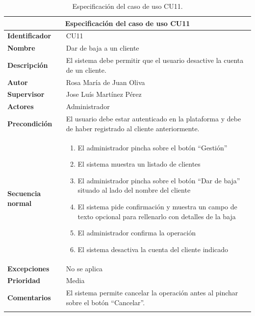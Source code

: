 \documentclass[pdftex,11pt,a4paper]{book}
\begin{document}

\renewcommand{\tablename}{Tabla}
\renewcommand{\arraystretch}{1,7}

\begin{center}
\begin{longtable}{|m{}|m{11cm}|}
\hline
\multicolumn{2}{|c|}{\textbf{Especificación del caso de uso CU11}}\\
\hline 
\endhead

\textbf{Identificador} & CU11  
\\ \hline
\textbf{Nombre} & Dar de baja a un cliente 
\\ \hline
\textbf{Descripción} & El sistema debe permitir que el usuario desactive la cuenta de un cliente.
\\ \hline
\textbf{Autor} & Rosa María de Juan Oliva 
\\ \hline
\textbf{Supervisor} & Jose Luís Martínez Pérez  
\\ \hline
\textbf{Actores} & Administrador 
\\ \hline
\textbf{Precondición} & El usuario debe estar autenticado en la plataforma y debe de haber registrado al cliente anteriormente.
\\ \hline
\textbf{Secuencia normal} & 
\begin{enumerate}
\addtolength{\itemsep}{-3mm}
\item El administrador pincha sobre el botón “Gestión”
\item El sistema muestra un listado de clientes
\item El administrador pincha sobre el botón “Dar de baja” situado al lado del nombre del cliente
\item El sistema pide confirmación y muestra un campo de texto opcional para rellenarlo con detalles de la baja
\item El administrador confirma la operación
\item El sistema desactiva la cuenta del cliente indicado
\end{enumerate}
\\ \hline
\textbf{Excepciones} & No se aplica
\\ \hline
\textbf{Prioridad} & Media 
\\ \hline
\textbf{Comentarios} & El sistema permite cancelar la operación antes al pinchar sobre el botón “Cancelar”.
\\ \hline

\caption{Especificación del caso de uso CU11.} \label{tablalarga:tablaCU11}
\end{longtable}
\end{center}
\end{document}
